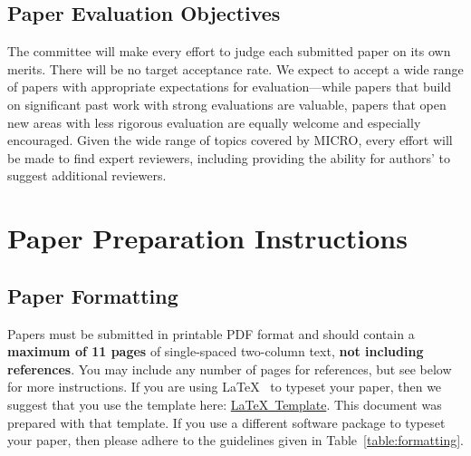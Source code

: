 \documentclass{sig-alternate}
\begin{document}
\subsection{Paper Evaluation Objectives} 
The committee will make every effort to judge each submitted paper on 
its own merits. There will be no target acceptance rate. 
We expect to accept a wide range of papers with appropriate expectations 
for evaluation---while papers that build on significant past work 
with strong evaluations are valuable, papers that open new areas with 
less rigorous evaluation are equally welcome and especially encouraged. 
Given the wide range of topics covered by MICRO, every effort will be 
made to find expert reviewers, including providing the ability for authors' 
to suggest additional reviewers. 

\section{Paper Preparation Instructions}

\subsection{Paper Formatting}

Papers must be submitted in printable PDF format and should contain a
{\bf maximum of 11 pages} of single-spaced two-column text, {\bf not
  including references}.  You may include any number of pages for
references, but see below for more instructions.  If you are using
\LaTeX~\cite{lamport94} to typeset your paper, then we suggest that
you use the template here:
\href{http://www.microarch.org/micro50/micro50-latex-template.tar.gz}{\LaTeX~Template}. This
document was prepared with that template.  If you use a different
software package to typeset your paper, then please adhere to the
guidelines given in Table~\ref{table:formatting}.
\end{document}
